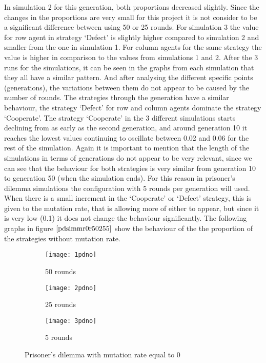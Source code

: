 In simulation 2 for this generation, both proportions decreased slightly. Since the changes in the proportions are very small for this project it is not consider to be a significant difference between using 50 or 25 rounds. For simulation 3 the value for row agent in strategy `Defect' is slightly higher compared to simulation 2  and smaller from the one in simulation 1. For column agents for the same strategy the value is higher in comparison to the values from simulations 1 and 2.
After the 3 runs for the simulations, it can be seen in the graphs from each simulation that they all have a similar pattern. And after analysing the different specific points (generations), the variations between them do not appear to be caused by the number of rounds. The strategies through the generation have a similar behaviour, the strategy `Defect' for row and column agents dominate the strategy `Cooperate'. The strategy `Cooperate' in the 3 different simulations starts declining from as early as the second generation, and around generation 10 it reaches the lowest values continuing to oscillate between 0.02 and 0.06 for the rest of the simulation. Again it is important to mention that the length of the simulations in terms of generations do not appear to be very relevant, since we can see that the behaviour for both strategies is very similar from generation 10 to generation 50 (when the simulation ends). For this reason in prisoner's dilemma simulations the configuration with 5 rounds per generation will used.
When there is a small increment in the `Cooperate' or `Defect' strategy, this is given to the mutation rate, that is allowing more of either to appear, but since it is very low (0.1) it does not change the behaviour significantly. The following graphs in figure $\ref{pdsimmr0r50255}$ show the behaviour of the the proportion of the strategies without mutation rate.

\begin{figure}[H]       
    \centering
    \begin{subfigure}[b]{0.3\textwidth}
	\centering
	{\texttt{[image: 1pdno]}}   
    	\caption{50 rounds}
	\label{fig:1pdmr0}
    \end{subfigure}
    \hfill
    \begin{subfigure}[b]{0.3\textwidth}
	\centering
	{\texttt{[image: 2pdno]}}   
    	\caption{25 rounds}
	\label{fig:2pdmr0}
    \end{subfigure}
    \hfill
    \begin{subfigure}[b]{0.3\textwidth}
	\centering
	{\texttt{[image: 3pdno]}}   
    	\caption{5 rounds}
	\label{fig:3pdmr0}
    \end{subfigure}
    \caption{Prisoner's dilemma with mutation rate equal to 0}
    \label{pdsimmr0r50255}
\end{figure}


